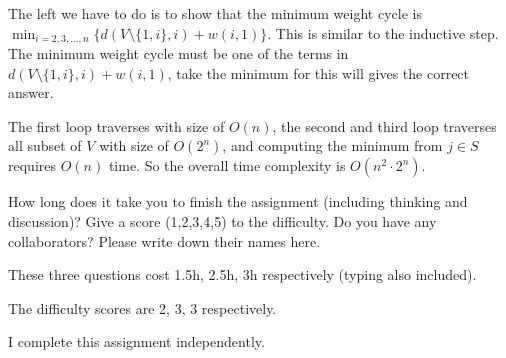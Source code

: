\documentclass{oxmathproblems}
\begin{document}
\begin{questions}
\begin{Solution}
\begin{parts}
The left we have to do is to show that the minimum weight cycle is $\min_{i=2,3,\ldots,n}\{d(V\setminus\{1,i\},i)+w(i,1)\}$. This is similar to the inductive step. The minimum weight cycle must be one of the terms in $d(V\setminus\{1,i\},i)+w(i,1)$, take the minimum for this will gives the correct answer.

\vspace{0.5cm}

The first loop traverses with size of $O(n)$, the second and third loop traverses all subset of $V$ with size of $O(2^n)$, and computing the minimum from $j\in S$ requires $O(n)$ time. So the overall time complexity is $O(n^2\cdot2^n)$.

\end{parts}

\end{Solution}

\vspace{1.5cm}

\miquestion
How long does it take you to finish the assignment (including thinking and discussion)?
Give a score (1,2,3,4,5) to the difficulty.
Do you have any collaborators?
Please write down their names here.

\begin{Solution}

These three questions cost 1.5h, 2.5h, 3h respectively (typing also included).

The difficulty scores are 2, 3, 3 respectively.

I complete this assignment independently.
\end{Solution}

\end{questions}
\end{document}
